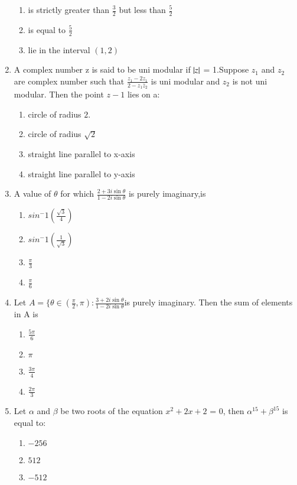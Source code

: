 \begin{enumerate}[label=\arabic*.,ref=\thesubsection.\theenumi]
\begin{enumerate}
    \item  is strictly greater than $\frac{3}{2}$ but less than $\frac {5}{2}$    
    \item  is equal to $\frac {5}{2}$
    \item  lie in the interval $(1,2)$
    \end{enumerate}
     \item A complex number z is said to be uni modular if $\left\vert z\right\vert$ = 1.Suppose $z_1$ and $z_2$ are complex number such that $\frac{z_1-2z_1}{2-z_1\bar z_2}$ is uni modular and $z_2$ is not uni modular. Then the point $z-1$ lies on a:
    \begin{enumerate}
    \item  circle of radius $2$.    
    \item  circle of radius $\sqrt 2$    
    \item  straight line parallel to x-axis
    \item  straight line parallel to y-axis
    \end{enumerate}
    \item  A value of $\theta$ for which $\frac{2+3i\sin\theta}{1-2i\sin\theta}$ is purely  imaginary,is 
    \begin{enumerate}
    \item  $sin^-1(\frac {\sqrt 3}{4})$    
    \item  $sin^-1(\frac {1}{\sqrt 3})$    
    \item  $\frac{\pi}{3}$
    \item  $\frac{\pi}{6}$
    \end{enumerate}
    \item Let $A = \{\theta \in (\frac{\pi}{2},\pi):\frac {3+2i\sin\theta}{1-2i\sin\theta }$is purely imaginary. Then the sum of elements in A is
    \begin{enumerate}
    \item  $\frac{5\pi}{6}$   
    \item  $\pi$    
    \item  $\frac{3\pi}{4}$
    \item  $\frac{2\pi}{3}$
    \end{enumerate}
    \item Let $\alpha$ and $\beta$ be two roots of the equation $x^2+2x+2$ = 0, then $\alpha^15+\beta^15$ is equal to:
    \begin{enumerate}
    \item  $-256$    
    \item  $512$    
    \item  $-512$

\end{enumerate}
\end{enumerate}
